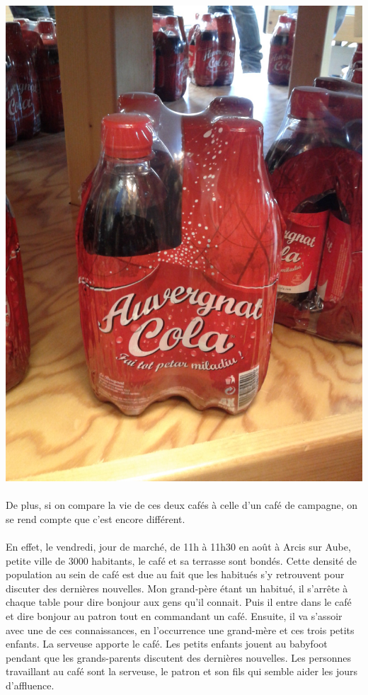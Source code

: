 \begin{center}
\includegraphics[scale=0.15,angle=270]{AuvergnatCola.jpg}
\end{center}

\paragraph{}
De plus, si on compare la vie de ces deux cafés à celle d’un café de campagne,
on se rend compte que c’est encore différent.

\paragraph{}
En effet, le vendredi, jour de marché, de 11h à 11h30 en août à Arcis sur Aube,
petite ville de 3000 habitants, le café et sa terrasse sont bondés. Cette
densité de population au sein de café est due au fait que les habitués s’y
retrouvent pour discuter des dernières nouvelles. Mon grand-père étant un
habitué, il s’arrête à chaque table pour dire bonjour aux gens qu’il connait.
Puis il entre dans le café et dire bonjour au patron tout en commandant un
café. Ensuite, il va s’assoir avec une de ces connaissances, en l’occurrence
une grand-mère et ces trois petits enfants. La serveuse apporte le café. Les
petits enfants jouent au babyfoot pendant que les grands-parents discutent des
dernières nouvelles. Les personnes travaillant au café sont la serveuse, le
patron et son fils qui semble aider les jours d’affluence.

